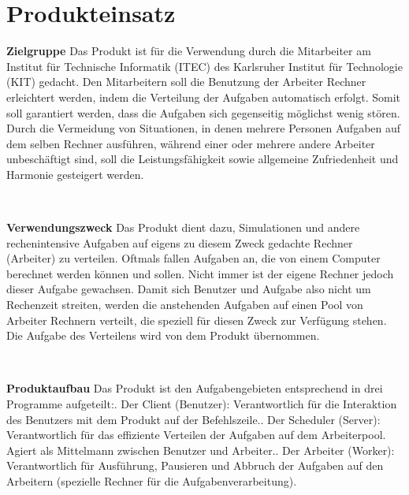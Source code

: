 \documentclass[a4paper,12pt]{article}
\begin{document}
\clearpage
\section{Produkteinsatz}
\begin{itemize}
\begin{minipage}[t]{\linewidth}
\item \textbf{Zielgruppe}\newline
Das Produkt ist für die Verwendung durch die Mitarbeiter am Institut für Technische Informatik (ITEC) des Karlsruher Institut für Technologie (KIT) gedacht.\newline
Den Mitarbeitern soll die Benutzung der Arbeiter Rechner erleichtert werden, indem die Verteilung der Aufgaben automatisch erfolgt. Somit soll garantiert werden, dass die Aufgaben sich gegenseitig möglichst wenig stören.\newline
Durch die Vermeidung von Situationen, in denen mehrere Personen Aufgaben auf dem selben Rechner ausführen, während einer oder mehrere andere Arbeiter unbeschäftigt sind, soll die Leistungsfähigkeit sowie allgemeine Zufriedenheit und Harmonie gesteigert werden.
\end{minipage}
\\

\begin{minipage}[t]{\linewidth}
\item \textbf{Verwendungszweck}\newline
Das Produkt dient dazu, Simulationen und andere rechenintensive Aufgaben auf eigens zu diesem Zweck gedachte Rechner (Arbeiter) zu verteilen.\newline
Oftmals fallen Aufgaben an, die von einem Computer berechnet werden können und sollen. Nicht immer ist der eigene Rechner jedoch dieser Aufgabe gewachsen. Damit sich Benutzer und Aufgabe also nicht um Rechenzeit streiten, werden die anstehenden Aufgaben auf einen Pool von Arbeiter Rechnern verteilt, die speziell für diesen Zweck zur Verfügung stehen. Die Aufgabe des Verteilens wird von dem Produkt übernommen.
\end{minipage}
\\

\begin{minipage}[t]{\linewidth}
\item \textbf{Produktaufbau}\newline
Das Produkt ist den Aufgabengebieten entsprechend in drei Programme aufgeteilt:. Der Client (Benutzer): Verantwortlich für die Interaktion des Benutzers mit dem Produkt auf der Befehlszeile.. Der Scheduler (Server): Verantwortlich für das effiziente Verteilen der Aufgaben auf dem Arbeiterpool. Agiert als Mittelmann zwischen Benutzer und Arbeiter.. Der Arbeiter (Worker): Verantwortlich für Ausführung, Pausieren und Abbruch der Aufgaben auf den Arbeitern (spezielle Rechner für die Aufgabenverarbeitung).
\end{minipage}
\end{itemize}
\newpage
\end{document}
